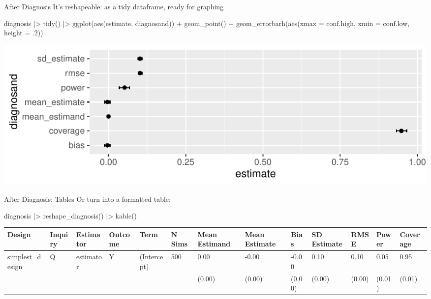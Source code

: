 \documentclass[
  11pt,
  ignorenonframetext,
]{beamer}
\newenvironment{Shaded}{\begin{snugshade}}{\end{snugshade}}
\newcommand{\AttributeTok}[1]{\textcolor[rgb]{0.40,0.45,0.13}{#1}}
\newcommand{\DecValTok}[1]{\textcolor[rgb]{0.68,0.00,0.00}{#1}}
\newcommand{\FunctionTok}[1]{\textcolor[rgb]{0.28,0.35,0.67}{#1}}
\newcommand{\NormalTok}[1]{\textcolor[rgb]{0.00,0.23,0.31}{#1}}
\newcommand{\SpecialCharTok}[1]{\textcolor[rgb]{0.37,0.37,0.37}{#1}}
\begin{document}
\begin{frame}[fragile]{After Diagnosis}
\protect\hypertarget{after-diagnosis-1}{}
It's reshapeable: as a tidy dataframe, ready for graphing

\begin{Shaded}
\begin{Highlighting}[]
\NormalTok{diagnosis }\SpecialCharTok{|\textgreater{}} 
  \FunctionTok{tidy}\NormalTok{() }\SpecialCharTok{|\textgreater{}} 
  \FunctionTok{ggplot}\NormalTok{(}\FunctionTok{aes}\NormalTok{(estimate, diagnosand)) }\SpecialCharTok{+} \FunctionTok{geom\_point}\NormalTok{() }\SpecialCharTok{+} 
  \FunctionTok{geom\_errorbarh}\NormalTok{(}\FunctionTok{aes}\NormalTok{(}\AttributeTok{xmax =}\NormalTok{ conf.high, }\AttributeTok{xmin =}\NormalTok{ conf.low, }\AttributeTok{height =}\NormalTok{ .}\DecValTok{2}\NormalTok{))}
\end{Highlighting}
\end{Shaded}

\includegraphics{0_lectures_files/figure-beamer/unnamed-chunk-40-1.pdf}
\end{frame}

\begin{frame}[fragile]{After Diagnosis: Tables}
\protect\hypertarget{after-diagnosis-tables}{}
Or turn into a formatted table:

\begin{Shaded}
\begin{Highlighting}[]
\NormalTok{diagnosis }\SpecialCharTok{|\textgreater{}} 
  \FunctionTok{reshape\_diagnosis}\NormalTok{() }\SpecialCharTok{|\textgreater{}} \FunctionTok{kable}\NormalTok{()}
\end{Highlighting}
\end{Shaded}

\begin{tabular}{l|l|l|l|l|l|l|l|l|l|l|l|l}
\hline
Design & Inquiry & Estimator & Outcome & Term & N Sims & Mean Estimand & Mean Estimate & Bias & SD Estimate & RMSE & Power & Coverage\\
\hline
simplest\_design & Q & estimator & Y & (Intercept) & 500 & 0.00 & -0.00 & -0.00 & 0.10 & 0.10 & 0.05 & 0.95\\
\hline
 &  &  &  &  &  & (0.00) & (0.00) & (0.00) & (0.00) & (0.00) & (0.01) & (0.01)\\
\hline
\end{tabular}
\end{frame}
\end{document}
